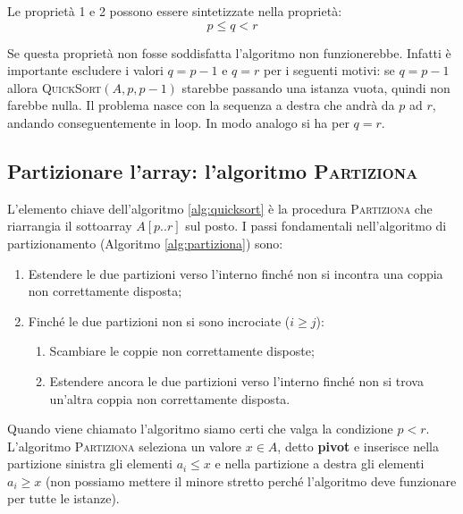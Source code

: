 Le proprietà 1 e 2 possono essere sintetizzate nella proprietà:
\begin{equation}\label{prop:quicksortpartiziona}
	p \leq q < r
\end{equation}

Se questa proprietà non fosse soddisfatta l'algoritmo non funzionerebbe. Infatti è importante escludere i valori $q=p-1$ e $q=r$ per i seguenti motivi: se $q=p-1$ allora \textsc{QuickSort}$(A,p,p-1)$ starebbe passando una istanza vuota, quindi non farebbe nulla. Il problema nasce con la sequenza a destra che andrà da $p$ ad $r$, andando conseguentemente in loop. In modo analogo si ha per $q=r$.

\subsection{Partizionare l'array: l'algoritmo \textsc{Partiziona}}
L'elemento chiave dell'algoritmo \ref{alg:quicksort} è la procedura \textsc{Partiziona} che riarrangia il sottoarray $A[p..r]$ sul posto. I passi fondamentali nell'algoritmo di partizionamento (Algoritmo \ref{alg:partiziona}) sono:
\begin{enumerate}
	\item Estendere le due partizioni verso l'interno finché non si incontra una coppia non correttamente disposta;
	\item Finché le due partizioni non si sono incrociate ($i \geq j$):
	\begin{enumerate}
		\item Scambiare le coppie non correttamente disposte;
		\item Estendere ancora le due partizioni verso l'interno finché non si trova un'altra coppia non correttamente disposta.
	\end{enumerate}
\end{enumerate}
Quando viene chiamato l'algoritmo siamo certi che valga la condizione $p<r$. L'algoritmo \textsc{Partiziona} seleziona un valore $x \in A$, detto \textbf{pivot} e inserisce nella partizione sinistra gli elementi $a_{i} \leq x$ e nella partizione a destra gli elementi $a_{i}\geq x$ (non possiamo mettere il minore stretto perché l'algoritmo deve funzionare per tutte le istanze). 


